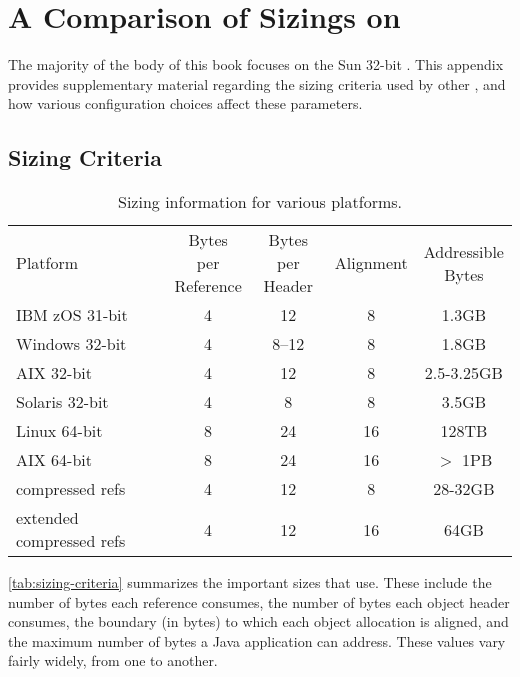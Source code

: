 \chapter{A Comparison of Sizings on \jres}
\label{chapter:jre-comparison}

The majority of the body of this book focuses on the Sun 32-bit \jre. This
appendix provides supplementary material regarding the sizing criteria used by
other \jres, and how various configuration choices affect these parameters.

\section{Sizing Criteria}


\begin{table}
\centering
\begin{tabular}{lcccc}
\toprule
Platform & \shortstack{Bytes per\\Reference} & \shortstack{Bytes per\\Header} & Alignment & \shortstack{Addressible\\Bytes} \\
\cmidrule(r){1-1} \cmidrule(r){2-5}
IBM zOS 31-bit &  4 & 12    & 8 & 1.3GB \\ 
Windows 32-bit &  4 & 8--12 & 8 & 1.8GB \\
AIX 32-bit     &  4 & 12    & 8 & 2.5-3.25GB\\ 
Solaris 32-bit &  4 & 8     & 8 & 3.5GB \\ 
\cmidrule(r){1-1} \cmidrule(r){2-5}
Linux 64-bit   &  8 & 24    & 16 & 128TB \\
AIX 64-bit     &  8 & 24    & 16 & $>$ 1PB \\
compressed refs & 4 & 12 & 8 & 28-32GB \\
extended compressed refs & 4 & 12 & 16 & 64GB \\
\bottomrule
\end{tabular}
\caption{Sizing information for various platforms.}
\label{tab:sizing-criteria}
\end{table}

\autoref{tab:sizing-criteria} summarizes the important sizes that \jres use.
These include the number of bytes each reference consumes, the number of bytes
each object header consumes, the boundary (in bytes) to which each object
allocation is aligned, and the maximum number of bytes a Java application can
address. These values vary fairly widely, from one \jre to another. 

